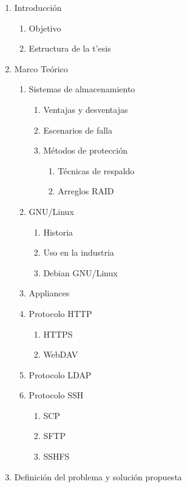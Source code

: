 {\begin{enumerate}
  \item Introducci\'{o}n
  \begin{enumerate}
    \item Objetivo
    \item Estructura de la t'{e}sis
  \end{enumerate}
  \item Marco Te\'{o}rico
  \begin{enumerate}
    \item Sistemas de almacenamiento
    \begin{enumerate}
      \item Ventajas y desventajas
      \item Escenarios de falla
      \item M\'{e}todos de protecci\'{o}n
      \begin{enumerate}
        \item T\'{e}cnicas de respaldo
        \item Arreglos RAID
      \end{enumerate}
    \end{enumerate}
    \item GNU/Linux
    \begin{enumerate}
      \item Historia
      \item Uso en la industria
      \item Debian GNU/Linux
    \end{enumerate}
    \item Appliances
    \item Protocolo HTTP
    \begin{enumerate}
      \item HTTPS
      \item WebDAV
    \end{enumerate}
    \item Protocolo LDAP
    \item Protocolo SSH
    \begin{enumerate}
      \item SCP
      \item SFTP
      \item SSHFS
    \end{enumerate}
  \end{enumerate}
  \item Definici\'{o}n del problema y soluci\'{o}n propuesta
  \begin{enumerate}

\end{enumerate}
\end{enumerate}}
